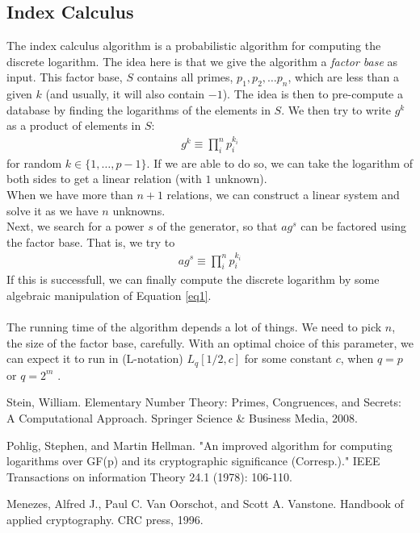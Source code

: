 \documentclass[a4paper, fleqn]{article}
\begin{document}
\subsection{Index Calculus}
The index calculus algorithm is a probabilistic algorithm \cite[pp. 109-110]{menezes} for computing the discrete logarithm. The idea here is that we give the algorithm a \textit{factor base} as input. This factor base, $S$ contains all primes, $p_1, p_2,\ldots p_n$, which are less than a given $k$ (and usually, it will also contain $-1$). The idea is then to pre-compute a database by finding the logarithms of the elements in $S$. We then try to write $g^k$ as a product of elements in $S$:
\begin{align*}
  g^k \equiv \prod_i^n p_i^{k_i}
\end{align*}
for random $k\in \{1,\ldots, p-1\}$. If we are able to do so, we can take the logarithm of both sides to get a linear relation (with $1$ unknown). \\
When we have more than $n+1$ relations, we can construct a linear system and solve it as we have $n$ unknowns. \\
Next, we search for a power $s$ of the generator, so that $ag^s$ can be factored using the factor base. That is, we try to
\begin{align}\label{eq1}
  ag^s\equiv \prod_i^n p_i^{k_i}
\end{align}
If this is successfull, we can finally compute the discrete logarithm by some algebraic manipulation of Equation \ref{eq1}. \\
\\
The running time of the algorithm depends a lot of things. We need to pick $n$, the size of the factor base, carefully. With an optimal choice of this parameter, we can expect it to run in (L-notation) $L_q[1/2, c]$ for some constant $c$, when $q=p$ or $q=2^m$ \cite[p. 112]{menezes}.

\begin{thebibliography}{9}

  Stein, William. Elementary Number Theory: Primes, Congruences, and Secrets: A Computational Approach. Springer Science \& Business Media, 2008.

  Pohlig, Stephen, and Martin Hellman. "An improved algorithm for computing logarithms over GF(p) and its cryptographic significance (Corresp.)." IEEE Transactions on information Theory 24.1 (1978): 106-110.

  Menezes, Alfred J., Paul C. Van Oorschot, and Scott A. Vanstone. Handbook of applied cryptography. CRC press, 1996.

\end{thebibliography}
\end{document}
